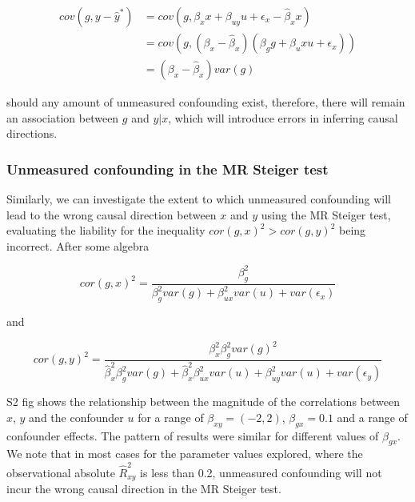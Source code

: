 \documentclass[]{article}
\begin{document}
\[
\begin{aligned}
cov(g, y - \hat{y}^*) & = cov(g, \beta_x x + \beta_{uy} u + \epsilon_x - \hat{\beta}_x x) \\
& = cov(g, (\beta_x - \hat{\beta}_x)(\beta_g g + \beta_ux u + \epsilon_x)) \\
& = (\beta_x - \hat{\beta}_x) var(g)
\end{aligned}
\]

should any amount of unmeasured confounding exist, therefore, there will
remain an association between \(g\) and \(y|x\), which will introduce
errors in inferring causal directions.

\subsubsection{Unmeasured confounding in the MR Steiger
test}\label{unmeasured-confounding-in-the-mr-steiger-test}

Similarly, we can investigate the extent to which unmeasured confounding
will lead to the wrong causal direction between \(x\) and \(y\) using
the MR Steiger test, evaluating the liability for the inequality
\(cor(g,x)^2 > cor(g,y)^2\) being incorrect. After some algebra

\[
cor(g,x)^2 = \frac{\beta_g^2}{\beta_g^2var(g) + \beta_{ux}^2 var(u) + var(\epsilon_x)}
\]

and

\[
cor(g,y)^2 = \frac{\beta_x^2 \beta_g^2 var(g)^2} {\hat{\beta}_x^2 \beta_g^2 var(g) + \hat{\beta}_x^2 \beta_{ux}^2 var(u) + \beta_{uy}^2 var(u) + var(\epsilon_y)}
\]

S2 fig shows the relationship between the magnitude of the correlations
between \(x\), \(y\) and the confounder \(u\) for a range of
\(\beta_{xy} = (-2,2)\), \(\beta_{gx} = 0.1\) and a range of confounder
effects. The pattern of results were similar for different values of
\(\beta_{gx}\). We note that in most cases for the parameter values
explored, where the observational absolute \(\hat{R}^2_{xy}\) is less
than 0.2, unmeasured confounding will not incur the wrong causal
direction in the MR Steiger test.
\end{document}
